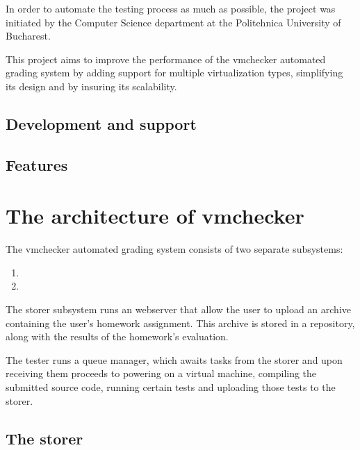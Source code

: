 In order to automate the testing process as much as possible, the \project project 
was initiated by the Computer Science department at the Politehnica 
University of Bucharest.

This project aims to improve the performance of the vmchecker automated grading
system by adding support for multiple virtualization types, simplifying its
design and by insuring its scalability.

\subsection{Development and support}
\label{sub-sec:vmc-history-dev}


\subsection{Features}
\label{sub-sec:vmc-history-features}


\section{The architecture of vmchecker}
\label{sec:vmc-architecture}

The vmchecker automated grading system consists of two separate subsystems:
\begin{enumerate}
\item {}
\item {}
\end{enumerate}

\begin{center}
\end{center}

The storer subsystem runs an webserver that allow the user to upload an archive
containing the user's homework assignment. This archive is stored in a repository,
along with the results of the homework's evaluation.

The tester runs a queue manager, which awaits tasks from the storer and upon
receiving them proceeds to powering on a virtual machine, compiling the submitted
source code, running certain tests and uploading those tests to the storer.


\subsection{The storer}
\label{sub-sec:storer}

